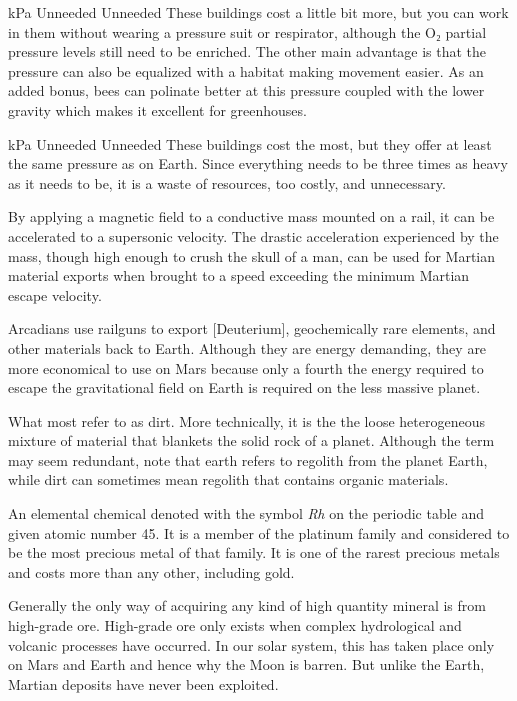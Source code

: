 {{    \bTR
       kPa \eTC
      \bTC Unneeded \eTC
      \bTC Unneeded \eTC
      \bTC These buildings cost a little bit more, but you can work in them without wearing a pressure suit or respirator, although the O₂ partial pressure levels still need to be enriched. The other main advantage is that the pressure can also be equalized with a habitat making movement easier. As an added bonus, bees can polinate better at this pressure coupled with the lower gravity which makes it excellent for greenhouses. \eTC
    \eTR

    \bTR
       kPa \eTC
      \bTC Unneeded \eTC
      \bTC Unneeded \eTC
      \bTC These buildings cost the most, but they offer at least the same pressure as on Earth. Since everything needs to be three times as heavy as it needs to be, it is a waste of resources, too costly, and unnecessary. \eTC
    \eTR
    \eTABLEbody

\eTABLE
}
\stopdefinition

By applying a magnetic field to a conductive mass mounted on a rail, it can be accelerated to a supersonic velocity. The drastic acceleration experienced by the mass, though high enough to crush the skull of a man, can be used for Martian material exports when brought to a speed exceeding the minimum Martian escape velocity.

Arcadians use railguns to export [Deuterium], geochemically rare elements, and other materials back to Earth. Although they are energy demanding, they are more economical to use on Mars because only a fourth the energy required to escape the gravitational field on Earth is required on the less massive planet.
\stopdefinition

What most refer to as dirt. More technically, it is the the loose heterogeneous mixture of material that blankets the solid rock of a planet. Although the term may seem redundant, note that earth refers to regolith from the planet Earth, while dirt can sometimes mean regolith that contains organic materials.
\stopdefinition

An elemental chemical denoted with the symbol {\it Rh} on the periodic table and given atomic number 45. It is a member of the platinum family and considered to be the most precious metal of that family. It is one of the rarest precious metals and costs more than any other, including gold.

Generally the only way of acquiring any kind of high quantity mineral is from high-grade ore. High-grade ore only exists when complex hydrological and volcanic processes have occurred. In our solar system, this has taken place only on Mars and Earth and hence why the Moon is barren. But unlike the Earth, Martian deposits have never been exploited.
\stopdefinition

}
